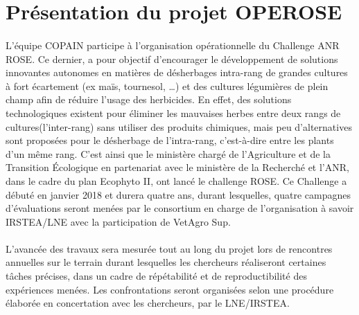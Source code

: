 \section{Présentation du projet \gls{OPEROSE}}
\paragraph{}
L’équipe COPAIN participe à l’organisation opérationnelle du Challenge \gls{ANR} \gls{ROSE}. Ce dernier, a pour objectif d’encourager le développement de solutions innovantes autonomes en matières de désherbages intra-rang de grandes cultures à fort écartement (ex maïs, tournesol, …) et des cultures légumières de plein champ afin de réduire l’usage des herbicides. En effet, des solutions technologiques existent pour éliminer les mauvaises herbes entre deux rangs de cultures(l’inter-rang) sans utiliser des produits chimiques, mais peu d’alternatives sont proposées pour le désherbage de l’intra-rang, c’est-à-dire entre les plants d’un même rang. C’est ainsi que le ministère chargé de l’Agriculture et de la Transition Écologique en partenariat avec le ministère de la Recherché et l’ANR, dans le cadre du plan Ecophyto II, ont lancé le challenge ROSE.  Ce Challenge a débuté en janvier 2018 et durera quatre ans, durant lesquelles, quatre campagnes d’évaluations seront menées par le consortium en charge de l’organisation à savoir IRSTEA/LNE avec la participation de VetAgro Sup.  
\paragraph{}
L’avancée des travaux sera mesurée tout au long du projet lors de rencontres annuelles sur le terrain durant lesquelles les chercheurs réaliseront certaines tâches précises, dans un cadre de répétabilité et de reproductibilité des expériences menées. Les confrontations seront organisées selon une procédure élaborée en concertation avec les chercheurs, par le LNE/IRSTEA. 

